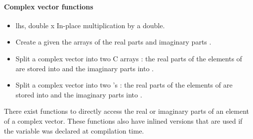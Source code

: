 \paragraph{Complex vector functions}

\begin{itemize}
\item {}
  {\PnlVectComplex \ptr lhs, double x}
  \sshortdescribe In-place multiplication by a double.

\item {}
  \sshortdescribe Create a \PnlVectComplex given the arrays of the
  real parts  and imaginary parts .
\item {}
    \sshortdescribe Split a complex vector into two C arrays : the
    real parts of the elements of  are stored into  and the
    imaginary parts into .
\item {}
  \sshortdescribe Split a complex vector into two \PnlVect's : the
  real parts of the elements of  are stored into  and the
imaginary parts into .
\end{itemize}

There exist functions to directly access the real or imaginary parts of an
element of a complex vector. These functions also have inlined versions that
are used if the variable  was declared at compilation time.

